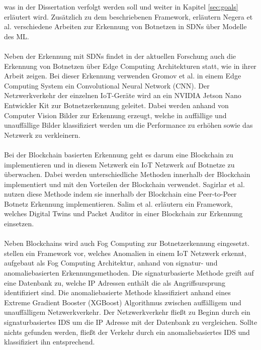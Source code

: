 was in der Dissertation verfolgt werden soll und weiter in Kapitel \ref{sec:goals} erläutert wird. Zusätzlich zu dem beschriebenen Framework, erläutern Negera et al. \cite{DBLP:journals/sensors/NegeraSDMA22}
verschiedene Arbeiten zur Erkennung von Botnetzen in SDNs über Modelle des ML. \\ \\ Neben der Erkennung mit SDNs findet in der aktuellen Forschung auch die Erkennung von Botnetzen über Edge Computing Architekturen 
statt, wie \cite{gromov2022edge} in ihrer Arbeit zeigen. Bei dieser Erkennung verwenden Gromov et al. in einem Edge Computing System ein Convolutional Neural Network (CNN). Der Netzwerkverkehr der einzelnen IoT-Geräte
wird an ein NVIDIA Jetson Nano Entwickler Kit zur Botnetzerkennung geleitet. Dabei werden anhand von Computer Vision Bilder zur Erkennung erzeugt, welche in auffällige und unauffällige Bilder klassifiziert werden um 
die Performance zu erhöhen sowie das Netzwerk zu verkleinern. 
\\ \\ Bei der Blockchain basierten Erkennung geht es darum eine Blockchain zu implementieren und in diesem Netzwerk ein IoT Netzwerk auf Botnetze zu überwachen. Dabei werden unterschiedliche Methoden innerhalb der Blockchain 
implementiert und mit den Vorteilen der Blockchain verwendet. Sagirlar et al. \cite{DBLP:journals/corr/abs-1809-10775} nutzen diese Methode indem sie innerhalb der Blockchain eine Peer-to-Peer Botnetz Erkennung implementieren. 
Salim et al. \cite{DBLP:journals/sensors/SalimATPP22} erläutern ein Framework, welches Digital Twins und Packet Auditor in einer Blockchain zur Erkennung einsetzen. \\ \\ Neben Blockchains wird auch Fog Computing zur 
Botnetzerkennung eingesetzt. \cite{Lawal2020AnAM} stellen ein Framework vor, welches Anomalien in einem IoT Netzwerk erkennt, aufgebaut als Fog Computing Architektur, anhand von signatur- und anomaliebasierten Erkennungsmethoden. 
Die signaturbasierte Methode greift auf eine Datenbank zu, welche IP Adressen enthält die als Angriffsursprung identifiziert sind. Die anomaliebasierte Methode klassifiziert anhand eines Extreme Gradient Booster 
(XGBoost) Algorithmus \cite{DBLP:journals/corr/ChenG16} zwischen auffälligem und unauffälligem Netzwerkverkehr. Der Netzwerkverkehr fließt zu Beginn durch ein signaturbasiertes IDS um die 
IP Adresse mit der Datenbank zu vergleichen. Sollte nichts gefunden werden, fließt der Verkehr durch ein anomaliebasiertes IDS und klassifiziert ihn entsprechend. 


